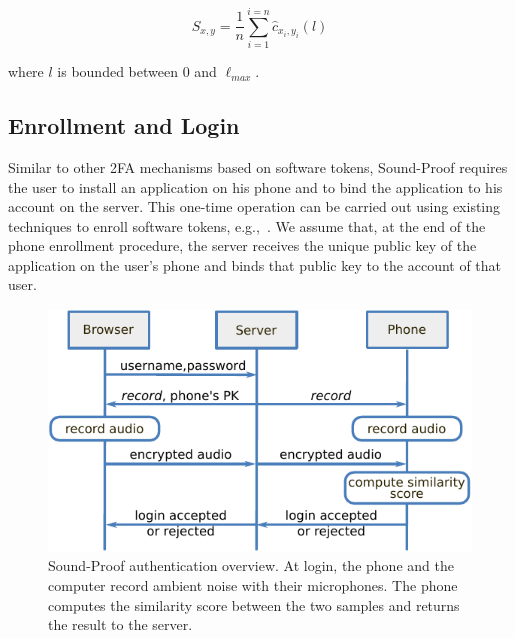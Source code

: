 $$S_{x,y} = \frac{1}{n}\sum_{i=1}^{i={n}}\hat{c}_{x_i,y_i}(l)$$

where $l$ is bounded between $0$ and $\ell_{max}$.

\subsection{Enrollment and Login}
Similar to other 2FA mechanisms based on software tokens,
Sound-Proof requires the user to install an application on his phone and to bind the application to his account on the server.
This one-time operation can be carried out using existing techniques to enroll software tokens, e.g.,~\cite{google_authentication}.
We assume that, at the end of the phone enrollment procedure, the server receives the unique public key of the application on the user's phone and binds that public key to the account of that user.

\begin{figure}[!ht]
    \begin{center}
        \includegraphics[width=.9\linewidth]{figures/phonesecures/sound-proof_overview}
        \caption[Sound-Proof authentication overview]{Sound-Proof authentication
        overview. At login, the phone and the computer record ambient noise with their
        microphones. The phone computes the similarity score between the two samples and
        returns the result to the server.}
        \label{fig:ps_sp_overview}
    \end{center}
\end{figure}

